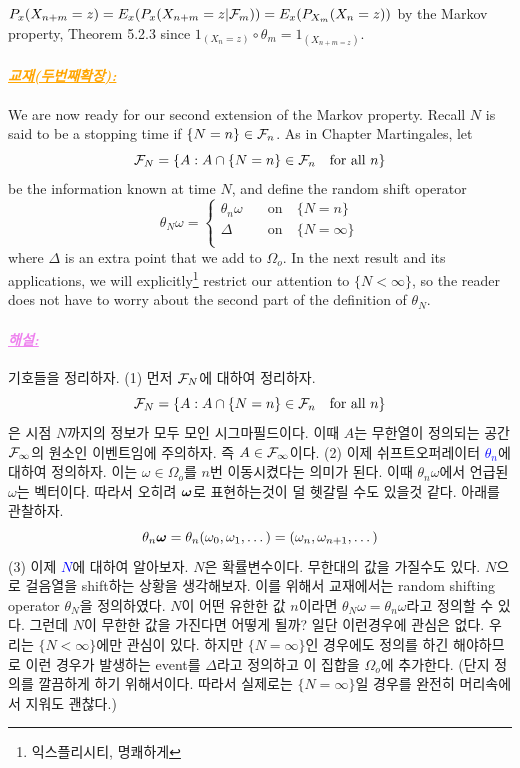 \documentclass[12pt,oneside,english,a4paper]{article}
\newcommand{\paraviolet}[1]{\paragraph{\LARGE\textcolor{violet}{\it\underline{\textbf{#1:}}}}\LARGE}
\newcommand{\paraorange}[1]{\paragraph{\LARGE\textcolor{orange}{\it\underline{\textbf{#1:}}}}\LARGE}
\newcommand{\bs}[1]{\mbox{\boldmath $#1$}}
\begin{document}
\proof $P_x(X_{n+m}=z)=E_x(P_x(X_{n+m}=z|{\cal F}_m))=E_x(P_{X_m}(X_n=z))$ by the Markov property, Theorem 5.2.3 since $1_{(X_n=z)}\circ \theta_m=1_{(X_{n+m=z})}$. 

\paraorange{교재(두번째확장)} We are now ready for our second extension of the Markov property.
Recall $N$ is said to be a stopping time if $\{N = n\}\in {\cal F}_n$. As in Chapter Martingales, let
\[
{\cal F}_N=\{A:A\cap \{N=n\} \in {\cal F}_n \quad \mbox{for all } n\}
\]
be the information known at time $N$, and define the random shift operator
\[
\theta_N \omega = 
\begin{cases}
\theta_n \omega  & \quad \mbox{on}\quad \{N=n\} \\ 
\Delta  & \quad \mbox{on}\quad \{N=\infty\} \\ 
 \end{cases}
\]
where $\Delta$ is an extra point that we add to $\Omega_o$. In the next result and its applications, we will explicitly\footnote{익스플리시티, 명쾌하게} restrict our attention to $\{N<\infty\}$, so the reader does not have to worry about the second part of the definition of $\theta_N$.

\paraviolet{해설} 기호들을 정리하자. (1) 먼저 \textcolor{blue}{${\cal F}_N$}에 대하여 정리하자. 
\[
{\cal F}_N=\{A:A\cap \{N=n\} \in {\cal F}_n \quad \mbox{for all } n\}
\]
은 시점 $N$까지의 정보가 모두 모인 시그마필드이다. 이때 $A$는 무한열이 정의되는 공간 ${\cal F}_{\infty}$의 원소인 이벤트임에 주의하자. 즉 $A \in {\cal F}_{\infty}$이다. (2) 이제 쉬프트오퍼레이터 \textcolor{blue}{$\theta_n$}에 대하여 정의하자. 이는 $\omega\in {\Omega}_{o}$를 $n$번 이동시켰다는 의미가 된다. 이때 $\theta_n \omega$에서 언급된 $\omega$는 벡터이다. 따라서 오히려 $\bs{\omega}$로 표현하는것이 덜 헷갈릴 수도 있을것 같다. 아래를 관찰하자. 
\[
\theta_n \bs{\omega}=\theta_n (\omega_0,\omega_1,\dots )=(\omega_n,\omega_{n+1},\dots)
\]
(3) 이제 \textcolor{blue}{$N$}에 대하여 알아보자. $N$은 확률변수이다. 무한대의 값을 가질수도 있다. $N$으로 걸음열을 shift하는 상황을 생각해보자. 이를 위해서 교재에서는 random shifting operator $\theta_N$을 정의하였다. $N$이 어떤 유한한 값 $n$이라면 $\theta_N\omega=\theta_n\omega$라고 정의할 수 있다. 그런데 $N$이 무한한 값을 가진다면 어떻게 될까? 일단 이런경우에 관심은 없다. 우리는 $\{N<\infty\}$에만 관심이 있다. 하지만 $\{N=\infty\}$인 경우에도 정의를 하긴 해야하므로 이런 경우가 발생하는 event를 $\Delta$라고 정의하고 이 집합을 $\Omega_o$에 추가한다. (단지 정의를 깔끔하게 하기 위해서이다. 따라서 실제로는 $\{N=\infty\}$일 경우를 완전히 머리속에서 지워도 괜찮다.)
\end{document}
